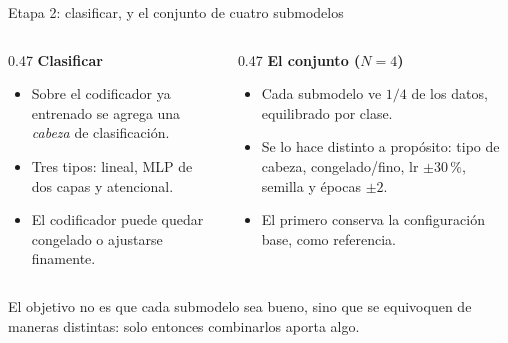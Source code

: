 \documentclass[aspectratio=169,10pt]{beamer}
\begin{document}

\begin{frame}{Etapa 2: clasificar, y el conjunto de cuatro submodelos}
  \small
  \begin{columns}[T, onlytextwidth]
    \begin{column}{0.47\textwidth}
      \textbf{Clasificar}
      \begin{itemize}
        \item Sobre el codificador ya entrenado se agrega una \emph{cabeza}
              de clasificación.
        \item Tres tipos: \alert{lineal}, \alert{MLP} de dos capas y
              \alert{atencional}.
        \item El codificador puede quedar congelado o ajustarse finamente.
      \end{itemize}
    \end{column}
    \begin{column}{0.47\textwidth}
      \textbf{El conjunto ($N{=}4$)}
      \begin{itemize}
        \item Cada submodelo ve \alert{$1/4$} de los datos, equilibrado por
              clase.
        \item Se lo hace distinto a propósito: tipo de cabeza,
              congelado/fino, lr $\pm 30\,\%$, semilla y épocas $\pm 2$.
        \item El primero conserva la configuración base, como referencia.
      \end{itemize}
    \end{column}
  \end{columns}

  \vfill
  \begin{block}{}
    El objetivo no es que cada submodelo sea bueno, sino que
    \alert{se equivoquen de maneras distintas}: solo entonces combinarlos
    aporta algo.
  \end{block}
\end{frame}
\end{document}
